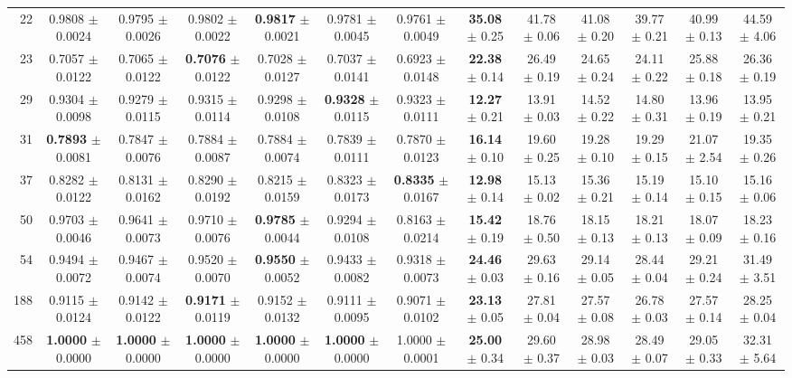 \begin{table}[t]
{\begin{tabular}{@{}rcccccc@{\hspace{7pt}}cccccc@{}}
22 & 0.9808 $\pm$ 0.0024 & 0.9795 $\pm$ 0.0026 & 0.9802 $\pm$ 0.0022 & \textbf{0.9817} $\pm$ 0.0021 & 0.9781 $\pm$ 0.0045 & 0.9761 $\pm$ 0.0049 & \textbf{35.08} $\pm$ 0.25 & 41.78 $\pm$ 0.06 & 41.08 $\pm$ 0.20 & 39.77 $\pm$ 0.21 & 40.99 $\pm$ 0.13 & 44.59 $\pm$ 4.06 \\
23 & 0.7057 $\pm$ 0.0122 & 0.7065 $\pm$ 0.0122 & \textbf{0.7076} $\pm$ 0.0122 & 0.7028 $\pm$ 0.0127 & 0.7037 $\pm$ 0.0141 & 0.6923 $\pm$ 0.0148 & \textbf{22.38} $\pm$ 0.14 & 26.49 $\pm$ 0.19 & 24.65 $\pm$ 0.24 & 24.11 $\pm$ 0.22 & 25.88 $\pm$ 0.18 & 26.36 $\pm$ 0.19 \\
29 & 0.9304 $\pm$ 0.0098 & 0.9279 $\pm$ 0.0115 & 0.9315 $\pm$ 0.0114 & 0.9298 $\pm$ 0.0108 & \textbf{0.9328} $\pm$ 0.0115 & 0.9323 $\pm$ 0.0111 & \textbf{12.27} $\pm$ 0.21 & 13.91 $\pm$ 0.03 & 14.52 $\pm$ 0.22 & 14.80 $\pm$ 0.31 & 13.96 $\pm$ 0.19 & 13.95 $\pm$ 0.21 \\
31 & \textbf{0.7893} $\pm$ 0.0081 & 0.7847 $\pm$ 0.0076 & 0.7884 $\pm$ 0.0087 & 0.7884 $\pm$ 0.0074 & 0.7839 $\pm$ 0.0111 & 0.7870 $\pm$ 0.0123 & \textbf{16.14} $\pm$ 0.10 & 19.60 $\pm$ 0.25 & 19.28 $\pm$ 0.10 & 19.29 $\pm$ 0.15 & 21.07 $\pm$ 2.54 & 19.35 $\pm$ 0.26 \\
37 & 0.8282 $\pm$ 0.0122 & 0.8131 $\pm$ 0.0162 & 0.8290 $\pm$ 0.0192 & 0.8215 $\pm$ 0.0159 & 0.8323 $\pm$ 0.0173 & \textbf{0.8335} $\pm$ 0.0167 & \textbf{12.98} $\pm$ 0.14 & 15.13 $\pm$ 0.02 & 15.36 $\pm$ 0.21 & 15.19 $\pm$ 0.14 & 15.10 $\pm$ 0.15 & 15.16 $\pm$ 0.06 \\
50 & 0.9703 $\pm$ 0.0046 & 0.9641 $\pm$ 0.0073 & 0.9710 $\pm$ 0.0076 & \textbf{0.9785} $\pm$ 0.0044 & 0.9294 $\pm$ 0.0108 & 0.8163 $\pm$ 0.0214 & \textbf{15.42} $\pm$ 0.19 & 18.76 $\pm$ 0.50 & 18.15 $\pm$ 0.13 & 18.21 $\pm$ 0.13 & 18.07 $\pm$ 0.09 & 18.23 $\pm$ 0.16 \\
54 & 0.9494 $\pm$ 0.0072 & 0.9467 $\pm$ 0.0074 & 0.9520 $\pm$ 0.0070 & \textbf{0.9550} $\pm$ 0.0052 & 0.9433 $\pm$ 0.0082 & 0.9318 $\pm$ 0.0073 & \textbf{24.46} $\pm$ 0.03 & 29.63 $\pm$ 0.16 & 29.14 $\pm$ 0.05 & 28.44 $\pm$ 0.04 & 29.21 $\pm$ 0.24 & 31.49 $\pm$ 3.51 \\
188 & 0.9115 $\pm$ 0.0124 & 0.9142 $\pm$ 0.0122 & \textbf{0.9171} $\pm$ 0.0119 & 0.9152 $\pm$ 0.0132 & 0.9111 $\pm$ 0.0095 & 0.9071 $\pm$ 0.0102 & \textbf{23.13} $\pm$ 0.05 & 27.81 $\pm$ 0.04 & 27.57 $\pm$ 0.08 & 26.78 $\pm$ 0.03 & 27.57 $\pm$ 0.14 & 28.25 $\pm$ 0.04 \\
458 & \textbf{1.0000} $\pm$ 0.0000 & \textbf{1.0000} $\pm$ 0.0000 & \textbf{1.0000} $\pm$ 0.0000 & \textbf{1.0000} $\pm$ 0.0000 & \textbf{1.0000} $\pm$ 0.0000 & 1.0000 $\pm$ 0.0001 & \textbf{25.00} $\pm$ 0.34 & 29.60 $\pm$ 0.37 & 28.98 $\pm$ 0.03 & 28.49 $\pm$ 0.07 & 29.05 $\pm$ 0.33 & 32.31 $\pm$ 5.64 \\

\end{tabular}}
\end{table}
